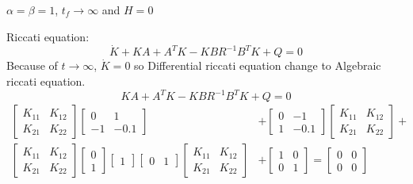 $\alpha = \beta = 1$, $t_f\to \infty $ and $H = 0$



Riccati equation:
\begin{equation}\label{riccati_equation}
	\dot{K} + KA +A^TK - KBR^{-1}B^TK + Q = 0
\end{equation}
Because of $t \to \infty$, $\dot K = 0$ so Differential riccati equation change to Algebraic riccati equation.  
\begin{equation}\label{Al_riccati_equation}
	KA +A^TK - KBR^{-1}B^TK + Q = 0
\end{equation}
\begin{align*}
 \begin{bmatrix}
		K_{11} & K_{12} \\
		K_{21} & K_{22}
	\end{bmatrix} 
	\begin{bmatrix}
		0 & 1 \\
		-1 & -0.1
	\end{bmatrix} &+
	\begin{bmatrix}
		0 & -1 \\
		1 & -0.1
	\end{bmatrix} 
	\begin{bmatrix}
		K_{11} & K_{12} \\
		K_{21} & K_{22}
	\end{bmatrix} + \\
 \begin{bmatrix}
	K_{11} & K_{12} \\
	K_{21} & K_{22}
\end{bmatrix}  \begin{bmatrix}
0 \\
1
\end{bmatrix}
 \begin{bmatrix}
	1
\end{bmatrix}
 \begin{bmatrix}
 0 & 1
\end{bmatrix}   
 \begin{bmatrix}
	K_{11} & K_{12} \\
	K_{21} & K_{22}
\end{bmatrix} &+  \begin{bmatrix}
1 & 0 \\
0 & 1
\end{bmatrix}  =  \begin{bmatrix}
0 & 0 \\
0 & 0
\end{bmatrix} 
\end{align*}
